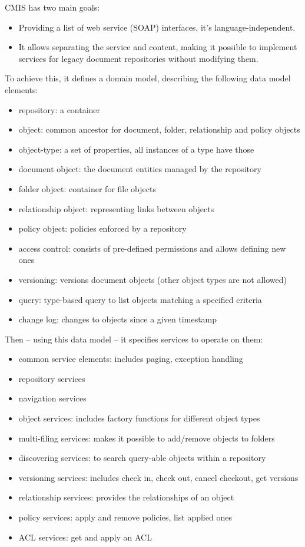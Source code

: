CMIS has two main goals:

\begin{itemize}
\item Providing a list of web service (SOAP) interfaces, it's language-independent.
\item It allows separating the service and content, making it possible to
implement services for legacy document repositories without modifying them.
\end{itemize}

To achieve this, it defines a domain model, describing the following data model
elements:

\begin{itemize}
\item repository: a container
\item object: common ancestor for document, folder, relationship and policy objects
\item object-type: a set of properties, all instances of a type have those
\item document object: the document entities managed by the repository
\item folder object: container for file objects
\item relationship object: representing links between objects
\item policy object: policies enforced by a repository
\item access control: consists of pre-defined permissions and allows defining new ones
\item versioning: versions document objects (other object types are not allowed)
\item query: type-based query to list objects matching a specified criteria
\item change log: changes to objects since a given timestamp
\end{itemize}

Then -- using this data model -- it specifies services to operate on them:

\begin{itemize}
\item common service elements: includes paging, exception handling
\item repository services
\item navigation services
\item object services: includes factory functions for different object types
\item multi-filing services: makes it possible to add/remove objects to folders
\item discovering services: to search query-able objects within a repository
\item versioning services: includes check in, check out, cancel checkout, get
	versions
\item relationship services: provides the relationships of an object
\item policy services: apply and remove policies, list applied ones
\item ACL services: get and apply an ACL
\end{itemize}

